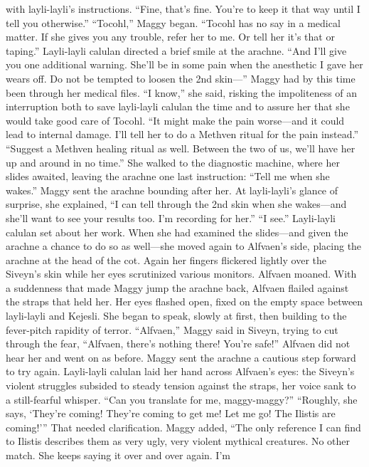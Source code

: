 \documentclass[9pt]{article}
\begin{document}
with layli-layli’s instructions.
“Fine, that’s fine. You’re to keep it that way until I tell you otherwise.”
“Tocohl,” Maggy began.
“Tocohl has no say in a medical matter. If she gives you any trouble, refer her to me. Or tell her it’s
that or taping.” Layli-layli calulan directed a brief smile at the arachne. “And I’ll give you one additional
warning. She’ll be in some pain when the anesthetic I gave her wears off. Do not be tempted to loosen
the 2nd skin—”
Maggy had by this time been through her medical files. “I know,” she said, risking the impoliteness of
an interruption both to save layli-layli calulan the time and to assure her that she would take good care
of Tocohl. “It might make the pain worse—and it could lead to internal damage. I’ll tell her to do a
Methven ritual for the pain instead.”
“Suggest a Methven healing ritual as well. Between the two of us, we’ll have her up and around in no
time.” She walked to the diagnostic machine, where her slides awaited, leaving the arachne one last
instruction: “Tell me when she wakes.”
Maggy sent the arachne bounding after her. At layli-layli’s glance of surprise, she explained, “I can
tell through the 2nd skin when she wakes—and she’ll want to see your results too. I’m recording for
her.”
“I see.” Layli-layli calulan set about her work. When she had examined the slides—and given the
arachne a chance to do so as well—she moved again to Alfvaen’s side, placing the arachne at the head
of the cot.
Again her fingers flickered lightly over the Siveyn’s skin while her eyes scrutinized various monitors.
Alfvaen moaned.
With a suddenness that made Maggy jump the arachne back, Alfvaen flailed against the straps that
held her. Her eyes flashed open, fixed on the empty space between layli-layli and Kejesli. She began to
speak, slowly at first, then building to the fever-pitch rapidity of terror.
“Alfvaen,” Maggy said in Siveyn, trying to cut through the fear, “Alfvaen, there’s nothing there!
You’re safe!”
Alfvaen did not hear her and went on as before. Maggy sent the arachne a cautious step forward to
try again.
Layli-layli calulan laid her hand across Alfvaen’s eyes: the Siveyn’s violent struggles subsided to
steady tension against the straps, her voice sank to a still-fearful whisper. “Can you translate for me,
maggy-maggy?”
“Roughly, she says, ‘They’re coming! They’re coming to get me! Let me go! The Ilistis are coming!’”
That needed clarification. Maggy added, “The only reference I can find to Ilistis describes them as very
ugly, very violent mythical creatures. No other match. She keeps saying it over and over again. I’m
\end{document}
